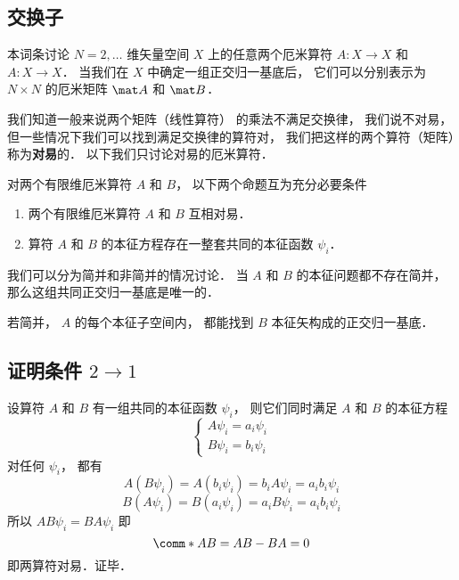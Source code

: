 


\subsection{交换子}
本词条讨论 $N = 2, \dots$ 维矢量空间 $X$ 上的任意两个厄米算符 $A: X \to X$ 和 $A: X \to X$． 当我们在 $X$ 中确定一组正交归一基底后， 它们可以分别表示为 $N \times N$ 的厄米矩阵 $\mat A$ 和 $\mat B$．

我们知道一般来说两个矩阵（线性算符）%
的乘法不满足交换律， 我们说不对易， 但一些情况下我们可以找到满足交换律的算符对， 我们把这样的两个算符（矩阵）称为\textbf{对易}的． 以下我们只讨论对易的厄米算符．

\begin{theorem}{}
对两个有限维厄米算符 $A$ 和 $B$， 以下两个命题互为充分必要条件
\begin{enumerate}
\item 两个有限维厄米算符 $A$ 和 $B$ 互相对易．
\item 算符 $A$ 和 $B$ 的本征方程存在一整套共同的本征函数 $\psi_i$．
\end{enumerate}
\end{theorem}

我们可以分为简并和非简并的情况讨论． 当 $A$ 和 $B$ 的本征问题都不存在简并， 那么这组共同正交归一基底是唯一的．

若简并， $A$ 的每个本征子空间内， 都能找到 $B$ 本征矢构成的正交归一基底．

\subsection{证明条件 $2 \to 1$}
设算符 $A$ 和 $B$ 有一组共同的本征函数 $\psi_i$，  则它们同时满足 $A$ 和 $B$ 的本征方程
\begin{equation}
\begin{cases}
A \psi_i = a_i \psi_i\\
B \psi_i = b_i \psi_i
\end{cases}
\end{equation}
对任何 $\psi_i$，  都有
\begin{equation}
A (B \psi_i) = A (b_i \psi_i) = b_iA \psi_i = a_i b_i \psi_i
\end{equation}
\begin{equation}
B (A \psi_i) = B (a_i \psi_i) = a_i B \psi_i = a_i b_i \psi_i
\end{equation}
所以 $AB \psi_i = BA \psi_i$ 即
\begin{equation}
\comm*{A}{B} = AB - BA = 0
\end{equation}
即两算符对易．证毕．

